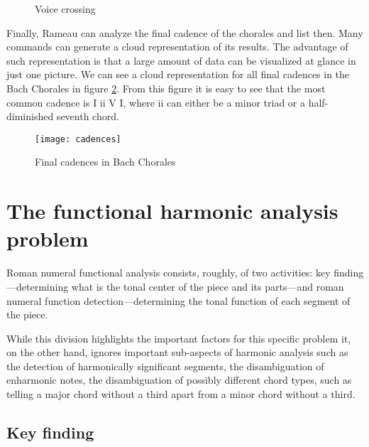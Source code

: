 \begin{figure}[!h]
  \centering
  \caption{Voice crossing}
  \label{fig:coral-003}
\end{figure}

Finally, Rameau can analyze the final cadence of the chorales and list
then. Many commands can generate a cloud representation of its
results. The advantage of such representation is that a large amount
of data can be visualized at glance in just one picture. We can see a
cloud representation for all final cadences in the Bach Chorales in
figure \ref{fig:cadences}. From this figure it is easy to see that the
most common cadence is I ii V I, where ii can either be a minor triad
or a half-diminished seventh chord.

\begin{figure}
  \centering
  \texttt{[image: cadences]}
  \caption{Final cadences in Bach Chorales}
  \label{fig:cadences}
\end{figure}


\section{The functional harmonic analysis problem}
\label{sec:problem}

Roman numeral functional analysis consists, roughly, of two
activities: key finding---determining what is the tonal center of the
piece and its parts---and roman numeral function
detection---determining the tonal function of each segment of the
piece.

While this division highlights the important factors for this specific
problem it, on the other hand, ignores important sub-aspects of
harmonic analysis such as the detection of harmonically significant
segments, the disambiguation of enharmonic notes, the disambiguation
of possibly different chord types, such as telling a major chord
without a third apart from a minor chord without a third.

\subsection{Key finding}
\label{sec:key-finding}

